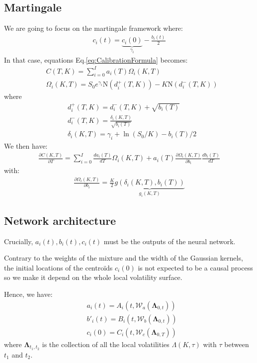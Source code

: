 \documentclass[10pt,a4paper]{article}
\begin{document}
\subsection{Martingale}
We are going to focus on the martingale framework where:
\begin{align}
c_i(t) = \underbrace{c_i(0)}_{\gamma_i} -\frac{b_i(t)}{2} 
\end{align}
In that case, equations Eq.\ref{eq:CalibrationFormula} becomes:
\begin{align}\label{eq:martingaleFormula}
&C(T,K) =  \sum_{i=0}^{I}  a_i(T)\Omega_i(K,T)\\
&\Omega_i(K,T) = S_0 e^{\gamma_i} \mathrm{N}\left( d_i^+(T,K) \right) - K \mathrm{N}\left(d_i^-(T,K)\right)
\end{align}
where
\begin{align}
  &d_i^+(T,K)= d_i^-(T,K) + \sqrt{b_i(T)} \\
  &d_i^-(T,K)  = \frac{\delta_i(K,T)}{\sqrt{b_i(T)}}\\
  &\delta_i(K,T) = \gamma_i + \ln(S_0/K) - b_i(T)/2
\end{align}
We then have:
\begin{align}
\frac{\partial C(K,T)}{\partial T} = \sum_{i=0}^{I} \frac{d a_i(T)}{d T} \Omega_i(K,T) + a_i(T)\frac{\partial \Omega_i(K,T)}{\partial b_i}\frac{d b_i(T)}{d T}
\end{align}
with:
\begin{align}
\frac{\partial \Omega_i(K,T)}{\partial b_i} = \frac{K}{2} \underbrace{g\left(\delta_i(K,T), b_i(T) \right)}_{g_i(K,T)} 
\end{align}
\subsection{Network architecture}
Crucially, $a_i(t),b_i(t),c_i(t)$ must be the outputs of the neural network.

Contrary to the weights of the mixture and the width of the Gaussian kernels, the initial locations of the centroïds $c_i(0)$ is not expected to be a causal process so we make it depend on the whole local volatility surface.   

Hence, we have:
\begin{align}
&a_i(t) = A_i(t,\mathcal{W}_a(\boldsymbol{\Lambda}_{0,t}))\\
&b'_i(t) = B_i(t,\mathcal{W}_b(\boldsymbol{\Lambda}_{0,t}))\\
&c_i(0) = C_i(t,\mathcal{W}_c(\boldsymbol{\Lambda}_{0,T}))
\end{align}
where $\boldsymbol{\Lambda}_{t_1,t_2}$ is the collection of all the local volatilities $\Lambda(K,\tau)$ with $\tau$  between $t_1$ and $t_2$.
\end{document}
